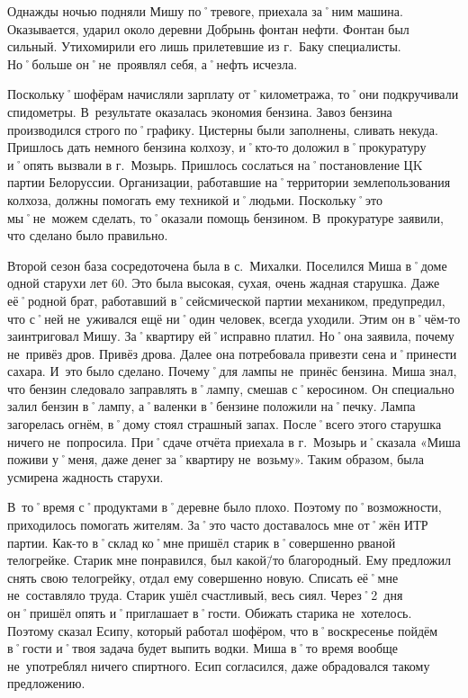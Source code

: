 Однажды ночью подняли Мишу по˚тревоге, приехала за˚ним машина. Оказывается, ударил около деревни Добрынь фонтан нефти. Фонтан был сильный. Утихомирили его лишь прилетевшие из г.~Баку специалисты. Но˚больше он˚не~проявлял себя, а˚нефть исчезла. 

Поскольку˚шофёрам начисляли зарплату от˚километража, то˚они подкручивали спидометры. В~результате оказалась экономия бензина. Завоз бензина производился строго по˚графику. Цистерны были заполнены, сливать некуда. Пришлось дать немного бензина колхозу, и˚кто-то доложил в˚прокуратуру и˚опять вызвали в г.~Мозырь. Пришлось сослаться на˚постановление ЦK партии Белоруссии. Организации, работавшие на˚территории землепользования колхоза, должны помогать ему техникой и˚людьми. Поскольку˚это мы˚не~можем сделать, то˚оказали помощь бензином. В~прокуратуре заявили, что сделано было правильно.

Второй сезон база сосредоточена была в с.~Михалки. Поселился Миша в˚доме одной старухи лет 60. Это была высокая, сухая, очень жадная старушка. Даже её˚родной брат, работавший в˚сейсмической партии механиком, предупредил, что с˚ней не~уживался ещё ни˚один человек, всегда уходили. Этим он в˚чём-то заинтриговал Мишу. За˚квартиру ей˚исправно платил. Но˚она заявила, почему не~привёз  дров. Привёз дрова. Далее она потребовала привезти сена и˚принести сахара. И~это было сделано. Почему˚для лампы не~принёс бензина. Миша знал, что бензин следовало заправлять в˚лампу, смешав с˚керосином. Он специально залил бензин в˚лампу, а˚валенки в˚бензине положили на˚печку. Лампа загорелась огнём, в˚дому стоял страшный запах. После˚всего этого старушка ничего не~попросила. При˚сдаче отчёта приехала в г.~Мозырь и˚сказала «Миша поживи у˚меня, даже денег за˚квартиру не~возьму». Таким образом, была усмирена жадность старухи.

В~то˚время с˚продуктами в˚деревне было плохо. Поэтому по˚возможности, приходилось помогать жителям. За˚это часто доставалось мне от˚жён ИТР партии. Как-то в˚склад ко˚мне пришёл старик в˚совершенно рваной телогрейке. Старик мне понравился, был какой\=/то благородный. Ему предложил снять свою телогрейку, отдал ему совершенно новую. Списать её˚мне не~составляло труда. Старик ушёл счастливый, весь сиял. Через˚2~дня он˚пришёл опять и˚приглашает в˚гости. Обижать старика не~хотелось. Поэтому сказал Есипу, который работал шофёром, что в˚воскресенье пойдём в˚гости и˚твоя задача будет выпить водки. Миша в˚то время вообще не~употреблял ничего спиртного. Есип согласился, даже обрадовался такому предложению. 

